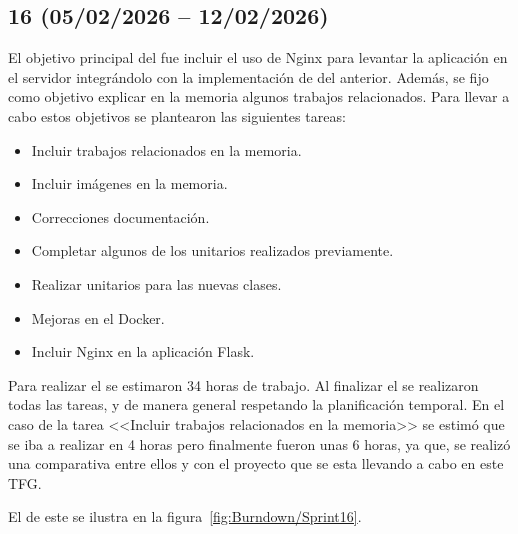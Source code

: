\subsection{ 16 (05/02/2026 -- 12/02/2026)}
El objetivo principal del  fue incluir el uso de Nginx para levantar la aplicación  en el servidor integrándolo con la implementación de  del  anterior. Además, se fijo como objetivo explicar en la memoria algunos trabajos relacionados. Para llevar a cabo estos objetivos se plantearon las siguientes tareas:
\begin{itemize}
\tightlist
	\item Incluir trabajos relacionados en la memoria.
	\item Incluir imágenes en la memoria.
	\item Correcciones documentación.
	\item Completar algunos de los  unitarios realizados previamente.
	\item Realizar  unitarios para las nuevas clases.
	\item Mejoras en el Docker.
	\item Incluir Nginx en la aplicación Flask.
\end{itemize}

Para realizar el  se estimaron 34 horas de trabajo. Al finalizar el  se realizaron todas las tareas, y de manera general respetando la planificación temporal. En el caso de la tarea <<Incluir trabajos relacionados en la memoria>> se estimó que se iba a realizar en 4 horas pero finalmente fueron unas 6 horas, ya que, se realizó una comparativa entre ellos y con el proyecto que se esta llevando a cabo en este TFG.

El  de este  se ilustra en la figura~\ref{fig:Burndown/Sprint16}.

